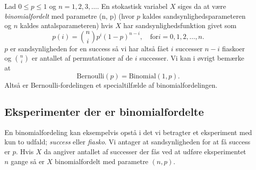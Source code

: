 \begin{definition}[Binomialfordelingen]
  Lad $0 \leq p \leq 1$ og $n = 1,2,3,\ldots$. En stokastisk variabel $X$ siges da at være \textit{binomialfordelt} med parametre (n, p) (hvor $p$ kaldes sandsynlighedsparameteren og $n$ kaldes antalsparameteren) hvis $X$ har sandsynlighedsfunktion givet som
  \[ 
  p(i) = \binom{n}{i}p^{i}(1-p)^{n-i}, \quad \text{for} i = 0,1,2,\ldots ,n
  .\]
  $p$ er sandsynligheden for en success så vi har altså fået $i$ successer $n-i$ fiaskoer og $\binom{n}{i}$ er antallet af permutationer af de $i$ successer. Vi kan i øvrigt bemærke at
  \[ 
    \mathrm{Bernoulli}(p) = \mathrm{Binomial}(1,p)
  .\]
  Altså er Bernoulli-fordelingen et specialtilfælde af binomialfordelingen.
\end{definition}

\subsection{Eksperimenter der er binomialfordelte}
En binomialfordeling kan eksempelvis opstå i det vi betragter et eksperiment med kun to udfald; \textit{success} eller \textit{fiasko}. Vi antager at sandsynligheden for at få success er $p$. Hvis $X$ da angiver antallet af successer der fås ved at udføre eksperimentet $n$ gange så er $X$ binomialfordelt med parametre $(n,p)$. 

